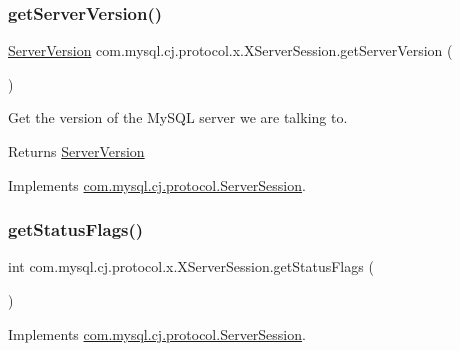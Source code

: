 \subsubsection{\texorpdfstring{get\+Server\+Version()}{getServerVersion()}}
{\footnotesize\ttfamily \mbox{\hyperlink{classcom_1_1mysql_1_1cj_1_1_server_version}{Server\+Version}} com.\+mysql.\+cj.\+protocol.\+x.\+X\+Server\+Session.\+get\+Server\+Version (\begin{DoxyParamCaption}{ }\end{DoxyParamCaption})}

Get the version of the My\+S\+QL server we are talking to.

\begin{DoxyReturn}{Returns}
\mbox{\hyperlink{classcom_1_1mysql_1_1cj_1_1_server_version}{Server\+Version}} 
\end{DoxyReturn}


Implements \mbox{\hyperlink{interfacecom_1_1mysql_1_1cj_1_1protocol_1_1_server_session_a96ad6ba424e7065b39d9b83dae49834a}{com.\+mysql.\+cj.\+protocol.\+Server\+Session}}.

\mbox{\label{classcom_1_1mysql_1_1cj_1_1protocol_1_1x_1_1_x_server_session_a40482eb0bd6517855653665d70e5fd58}} 
\subsubsection{\texorpdfstring{get\+Status\+Flags()}{getStatusFlags()}}
{\footnotesize\ttfamily int com.\+mysql.\+cj.\+protocol.\+x.\+X\+Server\+Session.\+get\+Status\+Flags (\begin{DoxyParamCaption}{ }\end{DoxyParamCaption})}



Implements \mbox{\hyperlink{interfacecom_1_1mysql_1_1cj_1_1protocol_1_1_server_session_a9cba9b511a27892b6e860172734c7d70}{com.\+mysql.\+cj.\+protocol.\+Server\+Session}}.

\mbox{\label{classcom_1_1mysql_1_1cj_1_1protocol_1_1x_1_1_x_server_session_adade76c5c1984674e31e277d46450123}} 
